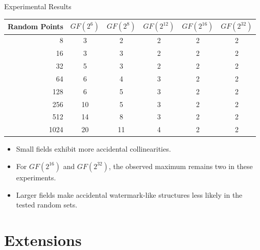 \documentclass[xcolor=dvipsnames,aspectratio=169]{beamer}
\begin{document}
	\begin{frame}{Experimental Results}
		\centering
		\scriptsize
		
		\begin{tabular}{r|ccccc}
			\toprule
			\textbf{Random Points} &
			$GF(2^6)$ & $GF(2^8)$ & $GF(2^{12})$ &
			$GF(2^{16})$ & $GF(2^{32})$ \\
			\midrule
			8    & 3  & 2  & 2 & 2 & 2 \\
			16   & 3  & 3  & 2 & 2 & 2 \\
			32   & 5  & 3  & 2 & 2 & 2 \\
			64   & 6  & 4  & 3 & 2 & 2 \\
			128  & 6  & 5  & 3 & 2 & 2 \\
			256  & 10 & 5  & 3 & 2 & 2 \\
			512  & 14 & 8  & 3 & 2 & 2 \\
			1024 & 20 & 11 & 4 & 2 & 2 \\
			\bottomrule
		\end{tabular}
		
		\vspace{0.3cm}
		\begin{itemize}
			\item Small fields exhibit more accidental collinearities.
			\item For $GF(2^{16})$ and $GF(2^{32})$, the observed
			maximum remains two in these experiments.
			\item Larger fields make accidental watermark-like
			structures less likely in the tested random sets.
		\end{itemize}
	\end{frame}
	
	\section{Extensions}
	
\end{document}
